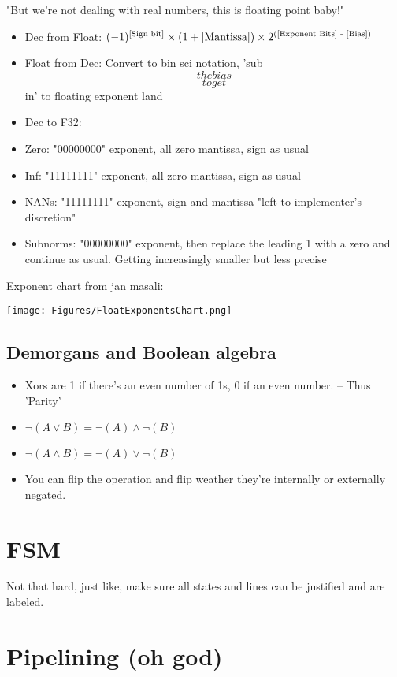 \documentclass[letterpaper,landscape]{article}
\begin{document}
\begin{multicols}{2}
"But we're not dealing with real numbers, this is floating point baby!"
\begin{itemize}
	\item Dec from Float: $(-1)^{\text{[Sign bit]}} \times (1 + \text{[Mantissa]}) \times 2^{(\text{[Exponent Bits] - \text{[Bias]}})}$
	\item Float from Dec: Convert to bin sci notation, 'sub \[the bias\] \[to get\] in' to floating exponent land
	\item Dec to F32: 
	\item Zero:     "00000000" exponent, all zero mantissa, sign as usual
	\item Inf:      "11111111" exponent, all zero mantissa, sign as usual
	\item NANs:     "11111111" exponent, sign and mantissa "left to implementer's discretion"
	\item Subnorms: "00000000" exponent, then replace the leading 1 with a zero and continue as usual. Getting increasingly smaller but less precise
\end{itemize}

Exponent chart from jan masali:

\begin{Figure}
	\centering
	\texttt{[image: Figures/FloatExponentsChart.png]}
\end{Figure}

\subsection*{Demorgans and Boolean algebra}
\begin{itemize}
	\item Xors are 1 if there's an even number of 1s, 0 if an even number. -- Thus 'Parity'
	\item $\lnot( A \lor B ) = \lnot( A ) \land \lnot( B )$
	\item $\lnot( A \land B ) = \lnot( A ) \lor \lnot( B )$
	\item You can flip the operation and flip weather they're internally or externally negated.
\end{itemize}


\section{FSM}
Not that hard, just like, make sure all states and lines can be justified and are labeled.


\section{Pipelining (oh god)}

\end{multicols}
\end{document}
